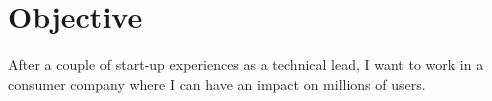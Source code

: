 \section{Objective}
After a couple of start-up experiences as a technical lead, I want to work in a consumer company where I can have an impact on millions of users.
